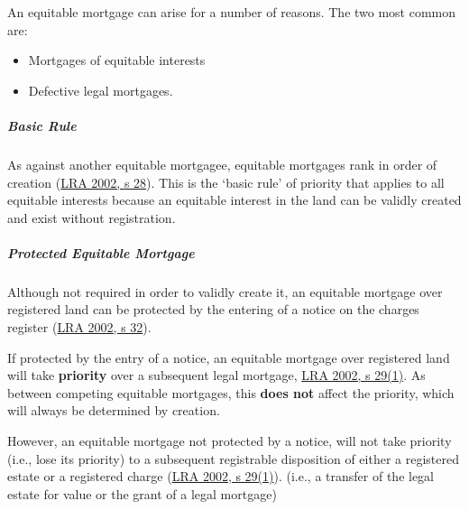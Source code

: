 \documentclass[
]{article}
\providecommand{\tightlist}{%
  \setlength{\itemsep}{0pt}\setlength{\parskip}{0pt}}
\begin{document}
An equitable mortgage can arise for a number of reasons. The two most
common are:

\begin{itemize}
\tightlist
\item
  Mortgages of equitable interests
\item
  Defective legal mortgages.
\end{itemize}

\hypertarget{basic-rule}{%
\subparagraph{Basic Rule}\label{basic-rule}}

As against another equitable mortgagee, equitable mortgages rank in
order of creation
(\href{https://www.legislation.gov.uk/ukpga/2002/9/section/28}{LRA 2002,
s 28}). This is the `basic rule' of priority that applies to all
equitable interests because an equitable interest in the land can be
validly created and exist without registration.

\hypertarget{protected-equitable-mortgage}{%
\subparagraph{Protected Equitable
Mortgage}\label{protected-equitable-mortgage}}

Although not required in order to validly create it, an equitable
mortgage over registered land can be protected by the entering of a
notice on the charges register
(\href{https://www.legislation.gov.uk/ukpga/2002/9/section/32}{LRA 2002,
s 32}).

If protected by the entry of a notice, an equitable mortgage over
registered land will take \textbf{priority} over a subsequent legal
mortgage,
\href{https://www.legislation.gov.uk/ukpga/2002/9/section/29}{LRA 2002,
s 29(1)}. As between competing equitable mortgages, this \textbf{does
not} affect the priority, which will always be determined by creation.

However, an equitable mortgage not protected by a notice, will not take
priority (i.e., lose its priority) to a subsequent registrable
disposition of either a registered estate or a registered charge
(\href{https://www.legislation.gov.uk/ukpga/2002/9/section/29}{LRA 2002,
s 29(1)}). (i.e., a transfer of the legal estate for value or the grant
of a legal mortgage)
\end{document}
